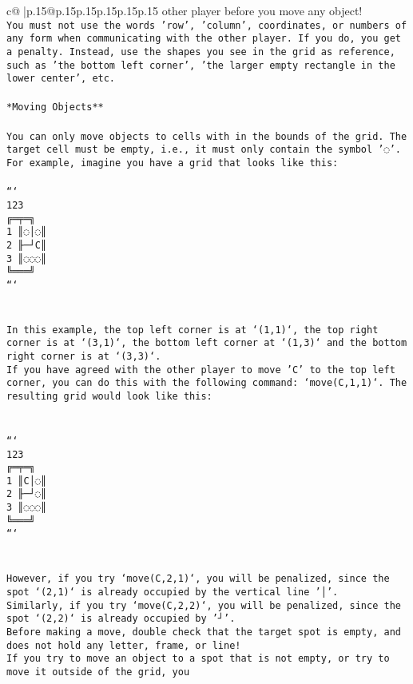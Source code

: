 \documentclass{article}
\begin{document}
{\begin{supertabular}{c@{$\;$}|p{.15\linewidth}@{}p{.15\linewidth}p{.15\linewidth}p{.15\linewidth}p{.15\linewidth}p{.15\linewidth}}
{{{other player before you move any object!\\ \tt * You must not use the words 'row', 'column', coordinates, or numbers of any form when communicating with the other player. If you do, you get a penalty. Instead, use the shapes you see in the grid as reference, such as 'the bottom left corner', 'the larger empty rectangle in the lower center', etc.\\ \tt \\ \tt **Moving Objects**\\ \tt \\ \tt * You can only move objects to cells with in the bounds of the grid. The target cell must be empty, i.e., it must only contain the symbol '◌'.\\ \tt * For example, imagine you have a grid that looks like this: \\ \tt \\ \tt ```\\ \tt     123\\ \tt    ╔═╤═╗\\ \tt  1 ║◌│◌║\\ \tt  2 ╟─┘C║\\ \tt  3 ║◌◌◌║\\ \tt    ╚═══╝\\ \tt ```\\ \tt \\ \tt \\ \tt * In this example, the top left corner is at `(1,1)`, the top right corner is at `(3,1)`, the bottom left corner at `(1,3)` and the bottom right corner is at `(3,3)`.\\ \tt * If you have agreed with the other player to move 'C' to the top left corner, you can do this with the following command: `move(C,1,1)`. The resulting grid would look like this: \\ \tt \\ \tt \\ \tt ```\\ \tt     123\\ \tt    ╔═╤═╗\\ \tt  1 ║C│◌║\\ \tt  2 ╟─┘◌║\\ \tt  3 ║◌◌◌║\\ \tt    ╚═══╝\\ \tt ```\\ \tt \\ \tt \\ \tt * However, if you try `move(C,2,1)`, you will be penalized, since the spot `(2,1)` is already occupied by the vertical line '│'.\\ \tt * Similarly, if you try `move(C,2,2)`, you will be penalized, since the spot `(2,2)` is already occupied by '┘'.\\ \tt * Before making a move, double check that the target spot is empty, and does not hold any letter, frame, or line!\\ \tt * If you try to move an object to a spot that is not empty, or try to move it outside of the grid, you }}}
\end{supertabular}}
\end{document}

